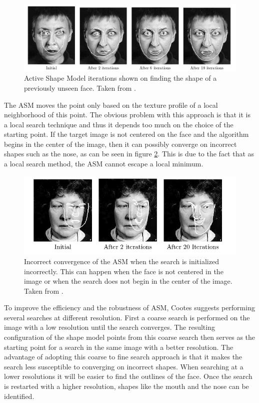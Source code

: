 \documentclass[11pt,a4paper,twoside]{report}
\begin{document}
\begin{figure}[H]
\centering
\includegraphics[scale=0.6]{images/scary_face2.png}
\caption{ Active Shape Model iterations shown on finding the shape of a
  previously unseen face. Taken from \cite{cootesOverview01}. }
\label{gr:asm}
\end{figure}

The ASM moves the point only based on the texture profile of a
local neighborhood of this point. The obvious problem with this approach is
that it is a local search technique and thus it depends too much on the choice of the
starting point. If the target image is not centered on the face and the
algorithm begins in the center of the image, then it can possibly converge on incorrect
shapes such as the nose, as can be seen in figure \ref{gr:bad_asm}. This is due to
the fact that as a local search method, the ASM cannot escape a local minimum.

\begin{figure}[H]
\centering
\includegraphics[scale=0.8]{images/bad_asm.png}
\caption{ Incorrect convergence of the ASM when the search is initialized
  incorrectly. This can happen when the face is not centered in the image or
  when the search does not begin in the center of the image. Taken from \cite{cootesOverview01}. }
\label{gr:bad_asm}
\end{figure}

To improve the efficiency and the robustness of ASM, Cootes
suggests performing several searches at different resolution. First a coarse
search is performed on the image with a low resolution until the search converges. The resulting configuration
of the shape model points from this coarse search
then serves as the starting point for a search in the same image with a better
resolution. The advantage of adopting this coarse to fine search approach is
that it makes the search less susceptible to converging on incorrect shapes. When
searching at a lower resolutions it will be easier to find the outlines of the
face. Once the search is restarted with a higher resolution, shapes like the
mouth and the nose can be identified.
\end{document}
